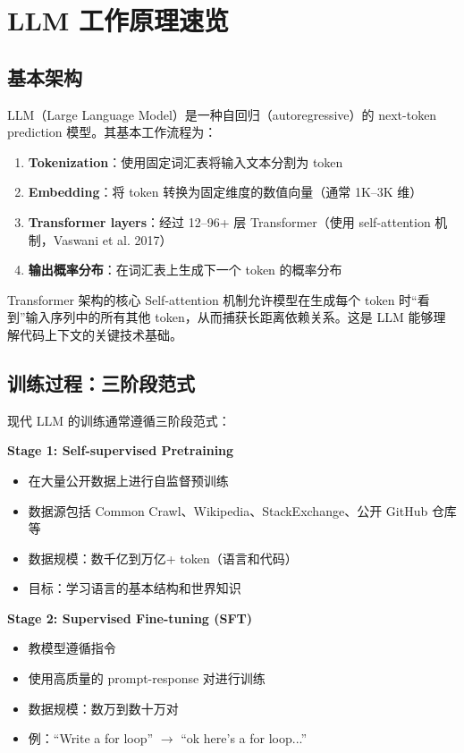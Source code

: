 \section{LLM 工作原理速览}

\subsection{基本架构}

LLM（Large Language Model）是一种自回归（autoregressive）的 next-token prediction 模型。其基本工作流程为：

\begin{enumerate}
    \item \textbf{Tokenization}：使用固定词汇表将输入文本分割为 token
    \item \textbf{Embedding}：将 token 转换为固定维度的数值向量（通常 1K--3K 维）
    \item \textbf{Transformer layers}：经过 12--96+ 层 Transformer（使用 self-attention 机制，Vaswani et al. 2017）
    \item \textbf{输出概率分布}：在词汇表上生成下一个 token 的概率分布
\end{enumerate}

\begin{knowledgebox}{Transformer 架构的核心}
Self-attention 机制允许模型在生成每个 token 时``看到''输入序列中的所有其他 token，从而捕获长距离依赖关系。这是 LLM 能够理解代码上下文的关键技术基础。
\end{knowledgebox}

\subsection{训练过程：三阶段范式}

现代 LLM 的训练通常遵循三阶段范式：

\textbf{Stage 1: Self-supervised Pretraining}
\begin{itemize}
    \item 在大量公开数据上进行自监督预训练
    \item 数据源包括 Common Crawl、Wikipedia、StackExchange、公开 GitHub 仓库等
    \item 数据规模：数千亿到万亿+ token（语言和代码）
    \item 目标：学习语言的基本结构和世界知识
\end{itemize}

\textbf{Stage 2: Supervised Fine-tuning (SFT)}
\begin{itemize}
    \item 教模型遵循指令
    \item 使用高质量的 prompt-response 对进行训练
    \item 数据规模：数万到数十万对
    \item 例：``Write a for loop'' $\rightarrow$ ``ok here's a for loop...''
\end{itemize}

